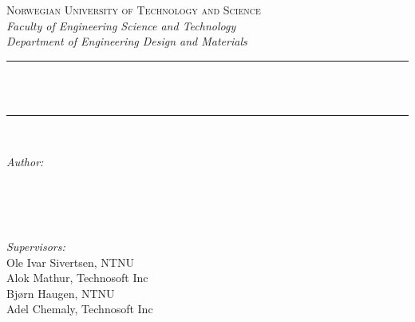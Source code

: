 \begin{titlepage}

\newcommand{\HRule}{\rule{\linewidth}{0.3mm}} %

\center

\textsc{\large Norwegian University of Technology and Science}\\[0.2cm] %
\slshape{\normalsize Faculty of Engineering Science and Technology}\\[0.1cm] %
\slshape{\normalsize Department of Engineering Design and Materials}\\[0.1cm] %


\HRule \\[0.4cm]
{ \LARGE \bfseries \textup{\mytitle }}\\[0.4cm] %
\HRule \\[1.5cm]


\begin{minipage}{0.4\textwidth}
\begin{flushleft} \small
\emph{Author:}\\
{\myauthorA} \\
{\myauthorB} \\
\phantom{A}
\end{flushleft}
\end{minipage}
~
\begin{minipage}{0.4\textwidth}
\begin{flushright} \small
\emph{Supervisors:} \\
Ole Ivar Sivertsen, NTNU \\%
Alok Mathur, Technosoft Inc \\
Bjørn Haugen, NTNU \\
Adel Chemaly, Technosoft Inc \\
\end{flushright}
\end{minipage}\\[7cm]


\end{titlepage}
